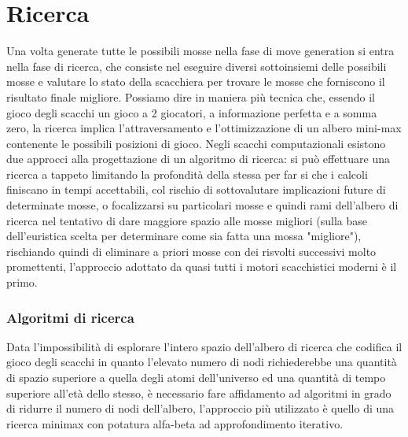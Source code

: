 \section{Ricerca} \label{ricerca}
Una volta generate tutte le possibili mosse nella fase di move generation si entra nella fase di ricerca, che consiste nel eseguire diversi sottoinsiemi delle possibili mosse e valutare
lo stato della scacchiera per trovare le mosse che forniscono il risultato finale migliore. Possiamo dire in maniera più tecnica che, essendo il gioco degli scacchi un gioco
a 2 giocatori, a informazione perfetta e a somma zero, la ricerca implica l'attraversamento e l'ottimizzazione di un albero mini-max contenente le possibili posizioni di gioco.
Negli scacchi computazionali esistono due approcci alla progettazione di un algoritmo di ricerca: si può effettuare una ricerca a tappeto limitando la profondità
della stessa per far si che i calcoli finiscano in tempi accettabili, col rischio di sottovalutare implicazioni future di determinate mosse, o focalizzarsi su particolari mosse e quindi
rami dell'albero di ricerca nel tentativo di dare maggiore spazio alle mosse migliori (sulla base dell'euristica scelta per determinare come sia fatta una mossa "migliore"), rischiando
quindi di eliminare a priori mosse con dei risvolti successivi molto promettenti, l'approccio adottato da quasi tutti i motori scacchistici moderni è il primo.

\subsubsection{Algoritmi di ricerca}
Data l'impossibilità di esplorare l'intero spazio dell'albero di ricerca che codifica il gioco degli scacchi in quanto l'elevato numero di nodi richiederebbe una quantità di spazio superiore
a quella degli atomi dell'universo ed una quantità di tempo superiore all'età dello stesso, è necessario fare affidamento ad algoritmi in
grado di ridurre il numero di nodi dell'albero, l'approccio più utilizzato è quello di una ricerca minimax con potatura alfa-beta ad approfondimento iterativo.


